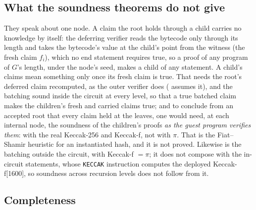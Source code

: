 \documentclass[11pt]{article}
\begin{document}
\subsection{What the soundness theorems do not give}\label{sec:notgive}

They speak about one node. A claim the root holds through a child carries no knowledge by itself:
the deferring verifier reads the bytecode only through its length and takes the bytecode's value at
the child's point from the witness (the fresh claim $f_i$), which no end statement requires true, so
a proof of any program of $G$'s length, under the node's seed, makes a child of any statement. A
child's claims mean something only once its fresh claim is true. That needs the root's deferred
claim recomputed, as the outer verifier does ( assumes it), and the batching
sound inside the circuit at every level, so that a true batched claim makes the children's fresh and
carried claims true; and to conclude from an accepted root that every claim held at the leaves, one
would need, at each internal node, the soundness of the children's proofs \emph{as the guest
program verifies them}: with the real Keccak-256 and Keccak-f, not with $\pi$. That is the
Fiat--Shamir heuristic for an instantiated hash, and it is not proved. Likewise  is
the batching outside the circuit, with Keccak-f $= \pi$; it does not compose with the in-circuit
statements, whose \texttt{KECCAK} instruction computes the deployed Keccak-f[1600], so soundness
across recursion levels does not follow from it.

\subsection{Completeness}
\end{document}
